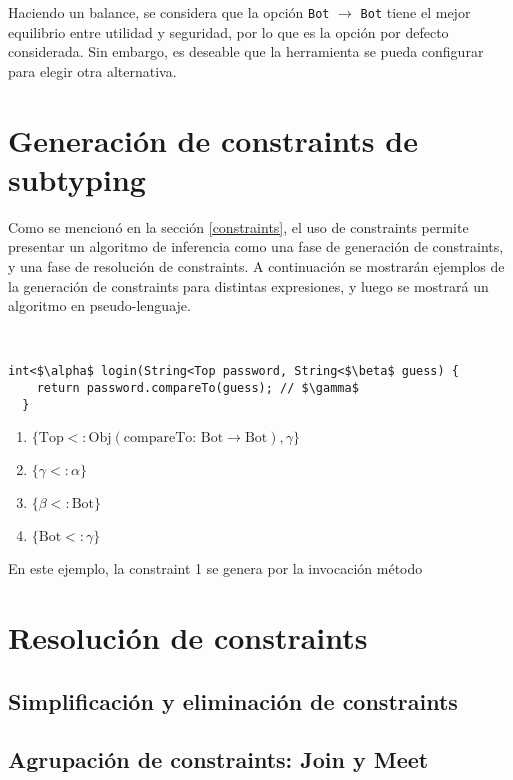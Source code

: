 Haciendo un balance, se considera que la opción \texttt{Bot} $\rightarrow$ \texttt{Bot} tiene el mejor equilibrio entre utilidad y seguridad, por lo que es la opción por defecto considerada. Sin embargo, es deseable que la herramienta se pueda configurar para elegir otra alternativa.

\section{Generación de constraints de subtyping}
Como se mencionó en la sección \ref{constraints}, el uso de constraints permite presentar un algoritmo de inferencia como una fase de generación de constraints, y una fase de resolución de constraints. A continuación se mostrarán ejemplos de la generación de constraints para distintas expresiones, y luego se mostrará un algoritmo en pseudo-lenguaje.

\begin{ej}\ \\
  \normalfont
\begin{lstlisting}[mathescape=true]
  int<$\alpha$ login(String<Top password, String<$\beta$ guess) {
    return password.compareTo(guess); // $\gamma$
  }
\end{lstlisting}

\begin{enumerate}
  \item $\{\text{Top} <: \text{Obj}(\text{compareTo: }\text{Bot} \rightarrow \text{Bot}), \gamma \}$
  \item $\{\gamma <: \alpha\}$
  \item $\{\beta <: \text{Bot}\}$
  \item $\{\text{Bot} <: \gamma\}$
\end{enumerate}
\end{ej}

En este ejemplo, la constraint 1 se genera por la invocación método

\section{Resolución de constraints}

\subsection{Simplificación y eliminación de constraints}
\subsection{Agrupación de constraints: Join y Meet}
